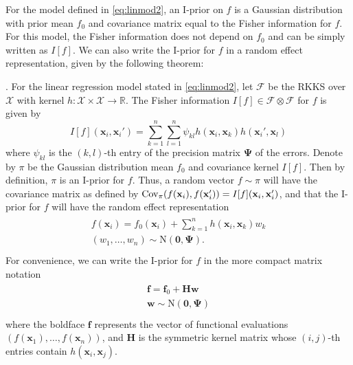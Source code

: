 For the model defined in \eqref{eq:linmod2}, an I-prior on $f$ is a Gaussian distribution with prior mean $f_0$ and covariance matrix equal to the Fisher information for $f$. For this model, the Fisher information does not depend on $f_0$ and can be simply written as $I[f]$. We can also write the I-prior for $f$ in a random effect representation, given by the following theorem:
\begin{theorem}{.}\label{theorem:iprior}
For the linear regression model stated in \eqref{eq:linmod2}, let $\mathcal F$ be the RKKS over $\mathcal{X}$ with kernel $h: \mathcal X \times \mathcal X \rightarrow \mathbb R$. The Fisher information $I[f] \in \mathcal F \otimes \mathcal F$ for $f$ is given by
$$
I[f](\mathbf x_i, \mathbf x_i') = \sum_{k=1}^n \sum_{l=1}^n \psi_{kl} h(\mathbf x_i, \mathbf x_k) h(\mathbf x_i', \mathbf x_l)
$$
where $\psi_{kl}$ is the $(k,l)$-th entry of the precision matrix $\boldsymbol\Psi$ of the errors. Denote by $\pi$ be the Gaussian distribution mean $f_0$ and covariance kernel $I[f]$. Then by definition, $\pi$ is an I-prior for $f$. Thus, a random vector $f \sim \pi$ will have the covariance matrix as defined by $\text{\normalfont Cov}_\pi(f(\mathbf x_i), f(\mathbf x_i')) = I[f](\mathbf x_i, \mathbf x_i')$, and that the I-prior for $f$ will have the random effect representation
\begin{align*}
\begin{gathered}
f(\mathbf x_i) = f_0(\mathbf x_i) + \sum_{k=1}^n h(\mathbf x_i, \mathbf x_k)w_k \\
(w_1,\dots,w_n) \sim \text{N}(\mathbf 0, \boldsymbol\Psi).\\
\end{gathered}
\end{align*}
For convenience, we can write the I-prior for $f$ in the more compact matrix notation
\begin{align*}
\begin{gathered}
\mathbf f = \mathbf f_0 + \mathbf H \mathbf w \\
\mathbf w \sim \text{N}(\mathbf 0, \boldsymbol\Psi)\\
\end{gathered}
\end{align*}
where the boldface $\mathbf f$ represents the vector of functional evaluations $(f(\mathbf x_1), \dots, f(\mathbf x_n))$, and $\mathbf H$ is the symmetric kernel matrix whose $(i,j)$-th entries contain $h(\mathbf x_i, \mathbf x_j)$.
\end{theorem}

